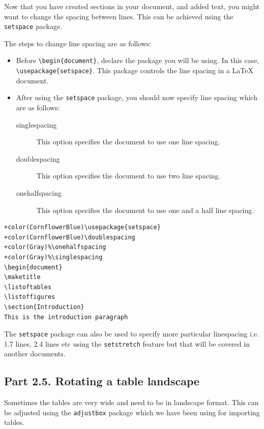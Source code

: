 \documentclass[12pts]{report}
\begin{document}
Now that you have created sections in your document, and added text, you might want to change the spacing between lines. This can be achieved using the \texttt{setspace} package. 

The steps to change line spacing are as follows:
\begin{itemize}
	\item Before \verb|\begin{document}|, declare the package you will be using. In this case, \verb|\usepackage{setspace}|. This package controls the line spacing in a {\LaTeX} document.
	\item After using the \texttt{setspace} package, you should now specify line spacing which are as follows:
	\begin{description}
		\item[singlespacing] This option specifies the document to use one line spacing.
		\item[doublespacing] This option specifies the document to use two line spacing.
		\item[onehalfspacing] This option specifies the document to use one and a half line spacing. 
	\end{description}
\end{itemize}
\begin{Verbatim}[commandchars=+\(\)]
+color(CornflowerBlue)\usepackage{setspace}
+color(CornflowerBlue)\doublespacing
+color(Gray)%\onehalfspacing
+color(Gray)%\singlespacing
\begin{document}
\maketitle
\listoftables
\listoffigures
\section{Introduction}
This is the introduction paragraph
\end{Verbatim}
The \texttt{setspace} package can also be used to specify more particular linespacing i.e. 1.7 lines, 2.4 lines etc using the \texttt{setstretch} feature but that will be covered in another documents. 

\subsection*{Part 2.5. Rotating a table landscape}

Sometimes the tables are very wide and need to be in landscape format. This can be adjusted using the \texttt{adjustbox} package which we have been using for importing tables. 
\end{document}

